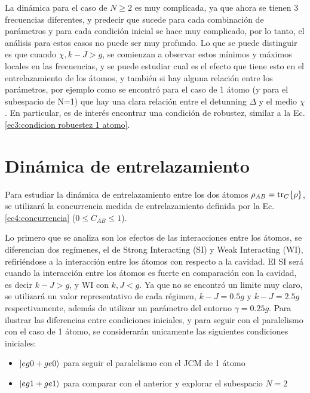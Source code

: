La dinámica para el caso de $N\geq2$ es muy complicada, ya que ahora se tienen 3 frecuencias diferentes, y predecir que sucede para cada combinación de parámetros y para cada condición inicial se hace muy complicado, por lo tanto, el análisis para estos casos no puede ser muy profundo. Lo que se puede distinguir es que cuando $\chi,k-J>g$, se comienzan a observar estos mínimos y máximos locales en las frecuencias, y se puede estudiar cual es el efecto que tiene esto en el entrelazamiento de los átomos, y también si hay alguna relación entre los parámetros, por ejemplo como se encontró para el caso de 1 átomo (y para el subespacio de N=1) que hay una clara relación entre el detunning $\Delta$ y el medio $\chi$. En particular, es de interés encontrar una condición de robustez, similar a la Ec. \ref{ec3:condicion robuestez 1 atomo}.

\section{Dinámica de entrelazamiento}
Para estudiar la dinámica de entrelazamiento entre los dos átomos $\rho_{AB}=\tr_C\{\rho\}$, se utilizará la concurrencia medida de entrelazamiento definida por la Ec. \ref{ec4:concurrencia} ($0\leq C_{AB} \leq 1$).

Lo primero que se analiza son los efectos de las interacciones entre los átomos, se diferencian dos regímenes, el de Strong Interacting (SI) y Weak Interacting (WI), refiriéndose a la interacción entre los átomos con respecto a la cavidad. El SI será cuando la interacción entre los átomos es fuerte en comparación con la cavidad, es decir $k-J>g$, y WI con $k,J<g$. Ya que no se encontró un limite muy claro, se utilizará un valor representativo de cada régimen, $k-J=0.5g$ y $k-J=2.5g$ respectivamente, además de utilizar un parámetro del entorno $\gamma=0.25g$. Para ilustrar las diferencias entre condiciones iniciales, y para seguir con el paralelismo con el caso de 1 átomo, se considerarán unicamente las siguientes condiciones iniciales:
\begin{itemize}
    \item $\ket{eg0+ge0}$ para seguir el paralelismo con el JCM de 1 átomo 
    \item $\ket{eg1+ge1}$ para comparar con el anterior y explorar el subespacio $N=2$
\end{itemize}

